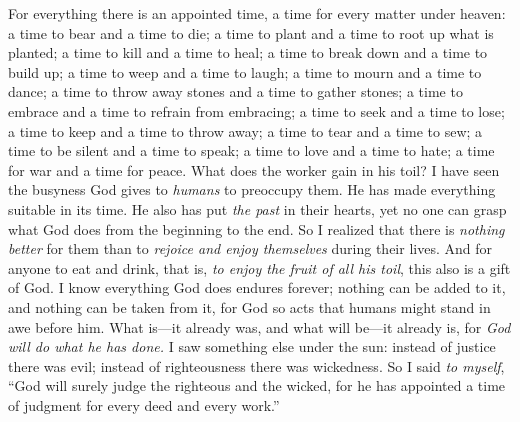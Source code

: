 \begin{biblechapter} %
 For everything there is an appointed time, a time for every matter under heaven:
\verse a time to bear and a time to die; 
a time to plant and a time to root up what is planted;
\verse a time to kill and a time to heal; 
a time to break down and a time to build up;
\verse a time to weep and a time to laugh; 
a time to mourn and a time to dance;
\verse a time to throw away stones and a time to gather stones; 
a time to embrace and a time to refrain from embracing;
\verse a time to seek and a time to lose; 
a time to keep and a time to throw away;
\verse a time to tear and a time to sew; 
a time to be silent and a time to speak;
\verse a time to love and a time to hate; 
a time for war and a time for peace.
\verse What does the worker gain in his toil?
 I have seen the busyness God gives to \textit{humans} to preoccupy them.
\verse He has made everything suitable in its time. He also has put \textit{the past} in their hearts, yet no one can grasp what God does from the beginning to the end.
\verse So I realized that there is \textit{nothing better} for them than to \textit{rejoice and enjoy themselves} during their lives.
\verse And for anyone to eat and drink, that is, \textit{to enjoy the fruit of all his toil}, this also is a gift of God.
\verse I know everything God does endures forever; 
nothing can be added to it, and nothing can be taken from it, 
for God so acts that humans might stand in awe before him.
\verse What is—it already was, 
and what will be—it already is, 
for \textit{God will do what he has done.}
 I saw something else under the sun: instead of justice there was evil; instead of righteousness there was wickedness.
\verse So I said \textit{to myself}, “God will surely judge the righteous and the wicked, for he has appointed a time of judgment for every deed and every work.”

\end{biblechapter}
